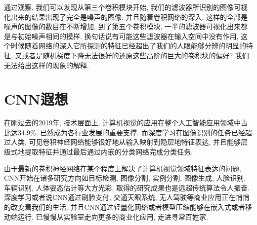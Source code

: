 \documentclass[lang=cn,11pt]{elegantpaper}
\begin{document}
通过观察, 我们可以发现从第三个卷积模块开始, 我们的滤波器所识别的图像可视化出来的结果出现了完全是噪声的图像. 并且随着卷积网络的深入, 这样的全部是噪声的图像的数目在不断增加, 到了第五个卷积模块, 一半的滤波器可视化出来都是与初始噪声相同的模样. 换句话说有可能这些滤波器在输入空间中没有作用, 这个时候随着网络的深入它所探测的特征已经超出了我们的人眼能够分辨的明显的特征, 又或者是随机梯度下降无法很好的还原这些高阶的巨大的卷积块的偏好? 我们无法给出这样的现象的解释.

\section{CNN遐想}
在刚过去的2019年, 技术层面上, 计算机视觉的应用在整个人工智能应用领域中占比达34.9\%, 已然成为各行业发展的重要支撑. 而深度学习在图像识别的任务已经超过人类, 可见卷积神经网络能够很好地从输入映射到隐层地特征表达, 并且能够层级式地提取特征并通过最后通过内嵌的分类网络完成分类任务. 

由于最新的卷积神经网络在某个程度上解决了计算机视觉领域特征表达的问题, CNN开始在诸多研究方向如目标检测, 图像分割, 实例分割, 图像生成, 人脸识别, 车辆识别, 人体姿态估计等大方光彩, 取得的研究成果也是远超传统算法令人振奋. 深度学习或者说CNN通过刷脸支付, 交通天眼系统, 无人驾驶等商业应用正在悄悄的改变着我们的生活. 并且CNN通过轻量化网络或者模型压缩能够在嵌入式或者移动端运行, 已慢慢从实验室走向更多的商业化应用, 走进寻常百姓家. 

\newpage
\nocite{*}



\end{document}
